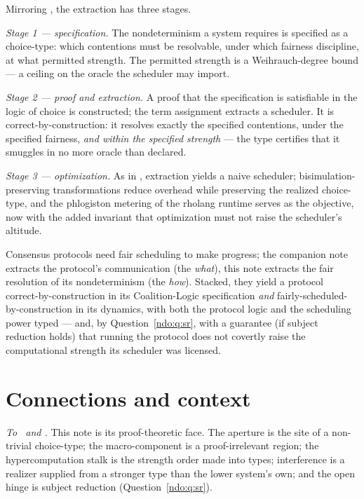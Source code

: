 Mirroring \cite{consensus}, the extraction has three stages.

\emph{Stage 1 --- specification.} The nondeterminism a system requires is specified as a choice-type: which
contentions must be resolvable, under which fairness discipline, at what permitted strength. The permitted
strength is a Weihrauch-degree bound --- a ceiling on the oracle the scheduler may import.

\emph{Stage 2 --- proof and extraction.} A proof that the specification is satisfiable in the logic of choice is
constructed; the term assignment extracts a scheduler. It is correct-by-construction: it resolves exactly the
specified contentions, under the specified fairness, \emph{and within the specified strength} --- the type
certifies that it smuggles in no more oracle than declared.

\emph{Stage 3 --- optimization.} As in \cite{consensus}, extraction yields a naive scheduler; bisimulation-preserving
transformations reduce overhead while preserving the realized choice-type, and the phlogiston metering of the
rholang runtime serves as the objective, now with the added invariant that optimization must not raise the
scheduler's altitude.

\begin{remark}
Consensus protocols need fair scheduling to make progress; the companion note extracts the protocol's
communication (the \emph{what}), this note extracts the fair resolution of its nondeterminism (the \emph{how}).
Stacked, they yield a protocol correct-by-construction in its Coalition-Logic specification \emph{and}
fairly-scheduled-by-construction in its dynamics, with both the protocol logic and the scheduling power typed ---
and, by Question~\ref{ndo:q:sr}, with a guarantee (if subject reduction holds) that running the protocol does not
covertly raise the computational strength its scheduler was licensed.
\end{remark}

\section{Connections and context}\label{chs:sec:conn}

\emph{To \chApr\ and \chAgy.} This note is its proof-theoretic face. The aperture is the site of a
non-trivial choice-type; the macro-component is a proof-irrelevant region; the hypercomputation stalk is the
strength order made into types; interference is a realizer supplied from a stronger type than the lower system's
own; and the open hinge is subject reduction (Question~\ref{ndo:q:sr}).

